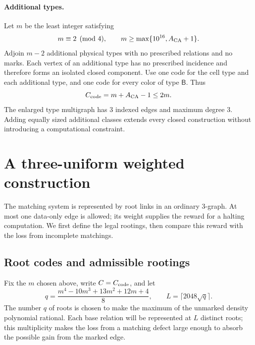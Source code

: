\documentclass[10pt]{article}
\numberwithin{equation}{section}
\theoremstyle{definition}
\begin{document}
\paragraph{Additional types.}
Let $m$ be the least integer satisfying
\[
 m\equiv2\pmod4,\qquad m\ge\max\{10^{16},A_{\rm CA}+1\}.
\]
Adjoin $m-2$ additional physical types with no prescribed relations and no marks. Each vertex of an additional type has no prescribed incidence and therefore forms an isolated closed component. Use one code for the cell type and each additional type, and one code for every color of type $\mathsf B$. Thus
\[
 C_{\rm code}=m+A_{\rm CA}-1\le2m.
\]
The enlarged type multigraph has 3 indexed edges and maximum degree 3. Adding equally sized additional classes extends every closed construction without introducing a computational constraint.

\section{A three-uniform weighted construction}\label{sec:v3-three}
The matching system is represented by root links in an ordinary $3$-graph. At most one data-only edge is allowed; its weight supplies the reward for a halting computation. We first define the legal rootings, then compare this reward with the loss from incomplete matchings.

\subsection{Root codes and admissible rootings}\label{sec:compiler}
Fix the $m$ chosen above, write $C=C_{\rm code}$, and let
\[
 q=\frac{m^4-10m^3+13m^2+12m+4}{8},
 \qquad L=\lceil2048\sqrt q\rceil.
\]
The number $q$ of roots is chosen to make the maximum of the unmarked density polynomial rational. Each base relation will be represented at $L$ distinct roots; this multiplicity makes the loss from a matching defect large enough to absorb the possible gain from the marked edge.
\end{document}
